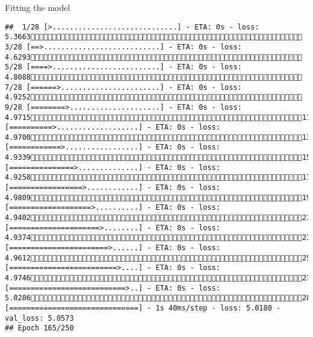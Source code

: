 \documentclass[
  ignorenonframetext,
]{beamer}
\begin{document}
\begin{frame}[fragile]{Fitting the model}
\begin{verbatim}
##  1/28 [>.............................] - ETA: 0s - loss: 5.3663 3/28 [==>...........................] - ETA: 0s - loss: 4.6293 5/28 [====>.........................] - ETA: 0s - loss: 4.8088 7/28 [======>.......................] - ETA: 0s - loss: 4.9252 9/28 [========>.....................] - ETA: 0s - loss: 4.971511/28 [==========>...................] - ETA: 0s - loss: 4.970013/28 [============>.................] - ETA: 0s - loss: 4.933915/28 [===============>..............] - ETA: 0s - loss: 4.925817/28 [=================>............] - ETA: 0s - loss: 4.980919/28 [===================>..........] - ETA: 0s - loss: 4.940221/28 [=====================>........] - ETA: 0s - loss: 4.937423/28 [=======================>......] - ETA: 0s - loss: 4.961225/28 [=========================>....] - ETA: 0s - loss: 4.974627/28 [===========================>..] - ETA: 0s - loss: 5.028628/28 [==============================] - 1s 40ms/step - loss: 5.0180 - val_loss: 5.0573
## Epoch 165/250

\end{verbatim}
\end{frame}
\end{document}
